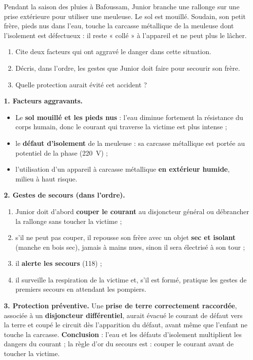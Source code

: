 \documentclass[11pt]{article}
\begin{document}
\begin{exoresolu}
Pendant la saison des pluies à Bafoussam, Junior branche une rallonge sur une prise extérieure pour utiliser une meuleuse. Le sol est mouillé. Soudain, son petit frère, pieds nus dans l'eau, touche la carcasse métallique de la meuleuse dont l'isolement est défectueux : il reste « collé » à l'appareil et ne peut plus le lâcher.
\begin{enumerate}
\item Cite deux facteurs qui ont aggravé le danger dans cette situation.
\item Décris, dans l'ordre, les gestes que Junior doit faire pour secourir son frère.
\item Quelle protection aurait évité cet accident ?
\end{enumerate}
\tcblower
\textbf{1. Facteurs aggravants.}
\begin{itemize}
\item Le \textbf{sol mouillé et les pieds nus} : l'eau diminue fortement la résistance du corps humain, donc le courant qui traverse la victime est plus intense ;
\item le \textbf{défaut d'isolement} de la meuleuse : sa carcasse métallique est portée au potentiel de la phase (\SI{220}{V}) ;
\item l'utilisation d'un appareil à carcasse métallique \textbf{en extérieur humide}, milieu à haut risque.
\end{itemize}
\textbf{2. Gestes de secours (dans l'ordre).}
\begin{enumerate}
\item Junior doit d'abord \textbf{couper le courant} au disjoncteur général ou débrancher la rallonge sans toucher la victime ;
\item s'il ne peut pas couper, il repousse son frère avec un objet \textbf{sec et isolant} (manche en bois sec), jamais à mains nues, sinon il sera électrisé à son tour ;
\item il \textbf{alerte les secours} (118) ;
\item il surveille la respiration de la victime et, s'il est formé, pratique les gestes de premiers secours en attendant les pompiers.
\end{enumerate}
\textbf{3. Protection préventive.} Une \textbf{prise de terre correctement raccordée}, associée à un \textbf{disjoncteur différentiel}, aurait évacué le courant de défaut vers la terre et coupé le circuit dès l'apparition du défaut, avant même que l'enfant ne touche la carcasse.
\textbf{Conclusion} : l'eau et les défauts d'isolement multiplient les dangers du courant ; la règle d'or du secours est : couper le courant avant de toucher la victime.
\end{exoresolu}
\end{document}
